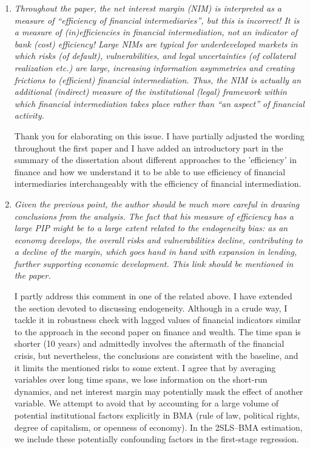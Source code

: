 \begin{enumerate}
    \item \textit{Throughout the paper, the net interest margin (NIM) is interpreted as a measure of ``efficiency of financial intermediaries'', but this is incorrect! It is a measure of (in)efficiencies in financial intermediation, not an indicator of bank (cost) efficiency! Large NIMs are typical for underdeveloped markets in which risks (of default), vulnerabilities, and legal uncertainties (of collateral realization etc.) are large, increasing information asymmetries and creating frictions to (efficient) financial intermediation. Thus, the NIM is actually an additional (indirect) measure of the institutional (legal) framework within which financial intermediation takes place rather than ``an aspect'' of financial activity.}

    Thank you for elaborating on this issue. I have partially adjusted the wording throughout the first paper and I have added an introductory part in the summary of the dissertation about different approaches to the 'efficiency' in finance and how we understand it to be able to use efficiency of financial intermediaries interchangeably with the efficiency of financial intermediation. %

    \item \textit{Given the previous point, the author should be much more careful in drawing conclusions from the analysis. The fact that his measure of efficiency has a large PIP might be to a large extent related to the endogeneity bias: as an economy develops, the overall risks and vulnerabilities decline, contributing to a decline of the margin, which goes hand in hand with expansion in lending, further supporting economic development. This link should be mentioned in the paper.}    
    
    I partly address this comment in one of the related above. I have extended the section devoted to discussing endogeneity. Although in a crude way, I tackle it in robustness check with lagged values of financial indicators similar to the approach in the second paper on finance and wealth. The time span is shorter (10 years) and admittedly involves the aftermath of the financial crisis, but nevertheless, the conclusions are consistent with the baseline, and it limits the mentioned risks to some extent. I agree that by averaging variables over long time spans, we lose information on the short-run dynamics, and net interest margin may potentially mask the effect of another variable. We attempt to avoid that by accounting for a large volume of potential institutional factors explicitly in \ac{BMA} (rule of law, political rights, degree of capitalism, or openness of economy). In the 2SLS--BMA estimation, we include these potentially confounding factors in the first-stage regression.


\end{enumerate}
